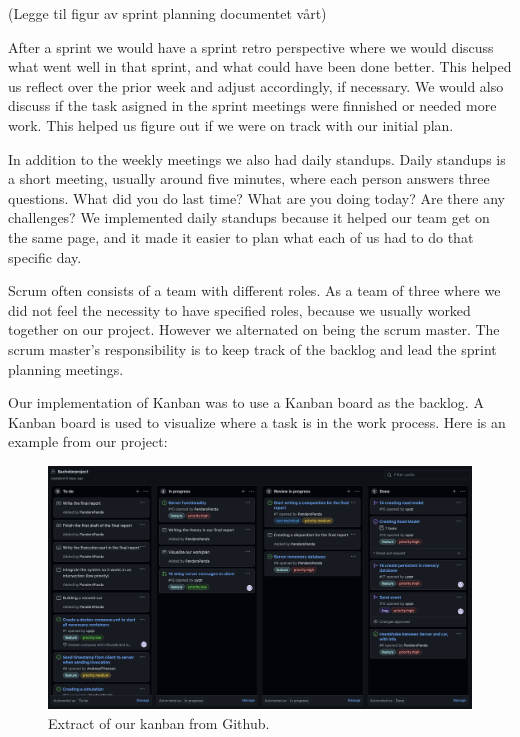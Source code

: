 (Legge til figur av sprint planning documentet vårt)

After a sprint we would have a sprint retro perspective where we would discuss what went well in that sprint, and what could have been done better. This helped us reflect over the prior week and adjust accordingly, if necessary. We would also discuss if the task asigned in the sprint meetings were finnished or needed more work. This helped us figure out if we were on track with our initial plan. 
 
In addition to the weekly meetings we also had daily standups. Daily standups is a short meeting, usually around five minutes, where each person answers three questions. What did you do last time? What are you doing today? Are there any challenges? We implemented daily standups because it helped our team get on the same page, and it made it easier to plan what each of us had to do that specific day.

Scrum often consists of a team with different roles. As a team of three where we did not feel the necessity to have specified roles, because we usually worked together on our project. However we alternated on being the scrum master. The scrum master’s responsibility is to keep track of the backlog and lead the sprint planning meetings.

Our implementation of Kanban was to use a Kanban board as the backlog. A Kanban board is used to visualize where a task is in the work process. Here is an example from our project:

\begin{figure}[h!]
	\centering
	\includegraphics[width=1\linewidth]{figures/kanban_screenshot}
	\caption[kanban screenshot]{Extract of our kanban from Github.}
	\label{fig:kanbanscreenshot}
\end{figure}

